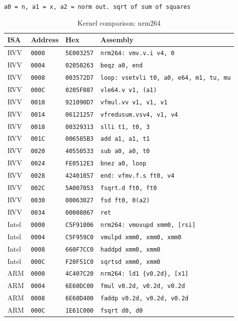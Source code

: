 \begin{table}[htbp]
\centering
\caption{Kernel comparison: nrm264}
\begingroup
\scriptsize
\setlength{\tabcolsep}{4pt}
\noindent \texttt{a0 = n, a1 = x, a2 = norm out. sqrt of sum of squares}\par
\vspace{0.6ex}
\begin{tabular}{@{}l|l|l|p{7.2cm}@{}}
\toprule
ISA & Address & Hex & Assembly \\
\midrule
RVV & \texttt{0000} & \texttt{5E003257} & \texttt{nrm264: vmv.v.i v4, 0} \\
RVV & \texttt{0004} & \texttt{02050263} & \texttt{beqz a0, end} \\
RVV & \texttt{0008} & \texttt{003572D7} & \texttt{loop: vsetvli t0, a0, e64, m1, tu, mu} \\
RVV & \texttt{000C} & \texttt{0205F087} & \texttt{vle64.v v1, (a1)} \\
RVV & \texttt{0010} & \texttt{921090D7} & \texttt{vfmul.vv v1, v1, v1} \\
RVV & \texttt{0014} & \texttt{06121257} & \texttt{vfredusum.vsv4, v1, v4} \\
RVV & \texttt{0018} & \texttt{00329313} & \texttt{slli t1, t0, 3} \\
RVV & \texttt{001C} & \texttt{006585B3} & \texttt{add a1, a1, t1} \\
RVV & \texttt{0020} & \texttt{40550533} & \texttt{sub a0, a0, t0} \\
RVV & \texttt{0024} & \texttt{FE0512E3} & \texttt{bnez a0, loop} \\
RVV & \texttt{0028} & \texttt{42401057} & \texttt{end: vfmv.f.s ft0, v4} \\
RVV & \texttt{002C} & \texttt{5A007053} & \texttt{fsqrt.d ft0, ft0} \\
RVV & \texttt{0030} & \texttt{00063027} & \texttt{fsd ft0, 0(a2)} \\
RVV & \texttt{0034} & \texttt{00008067} & \texttt{ret} \\
\midrule
Intel & \texttt{0000} & \texttt{C5F91006} & \texttt{nrm264: vmovupd xmm0, [rsi]} \\
Intel & \texttt{0004} & \texttt{C5F959C0} & \texttt{vmulpd xmm0, xmm0, xmm0} \\
Intel & \texttt{0008} & \texttt{660F7CC0} & \texttt{haddpd xmm0, xmm0} \\
Intel & \texttt{000C} & \texttt{F20F51C0} & \texttt{sqrtsd xmm0, xmm0} \\
\midrule
ARM & \texttt{0000} & \texttt{4C407C20} & \texttt{nrm264: ld1 \{v0.2d\}, [x1]} \\
ARM & \texttt{0004} & \texttt{6E60DC00} & \texttt{fmul v0.2d, v0.2d, v0.2d} \\
ARM & \texttt{0008} & \texttt{6E60D400} & \texttt{faddp v0.2d, v0.2d, v0.2d} \\
ARM & \texttt{000C} & \texttt{1E61C000} & \texttt{fsqrt d0, d0} \\
\bottomrule
\end{tabular}
\endgroup
\end{table}
\noindent{}\par
